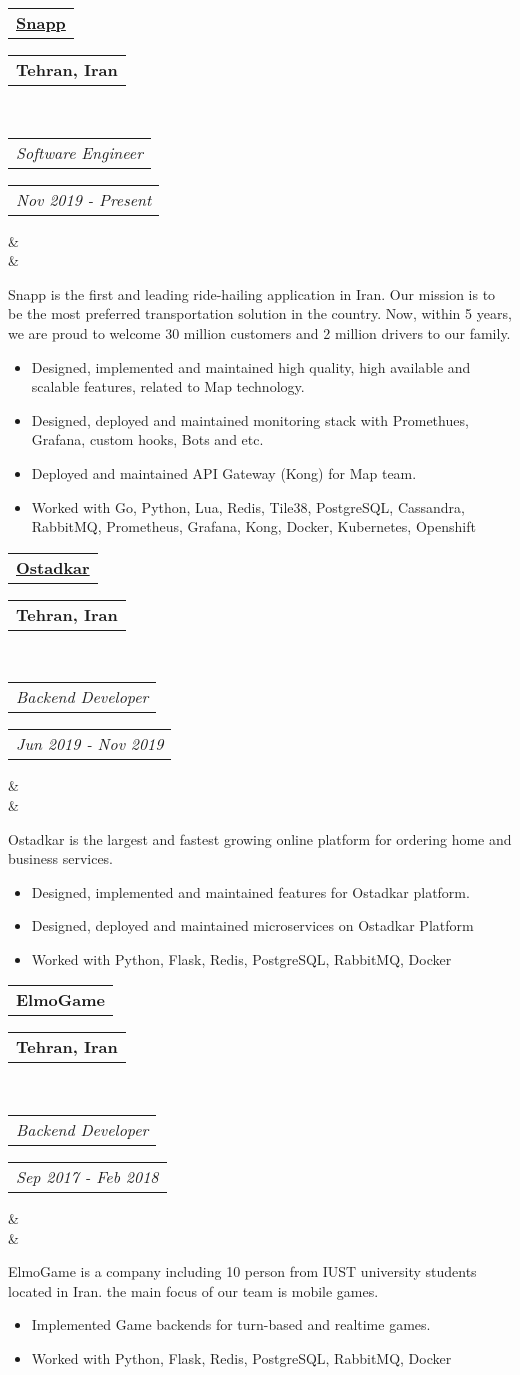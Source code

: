 \documentclass[11pt,a4paper,roman]{moderncv}        %
\makeatletter
\newcommand*{\customcventry}[7][.25em]{
  \begin{tabular}{@{}l}
  {\bfseries #4}
  \end{tabular}
  \hfill%
  \begin{tabular}{l@{}}
  {\bfseries #5}
  \end{tabular} \\
  \begin{tabular}{@{}l}
  {\itshape #3}
  \end{tabular}
  \hfill%
  \begin{tabular}{l@{}}
  {\itshape #2}
  \end{tabular}
  \ifx&#7&%
  \else{\\%
    \begin{minipage}{\maincolumnwidth}%
      \small#7%
    \end{minipage}}\fi%
  \par\addvspace{#1}}
\makeatother
\begin{document}
  {
    \customcventry{Nov 2019 - Present}{Software Engineer}{\href{https://snapp.ir}{Snapp}}{Tehran, Iran}{}
    \\Snapp is the first and leading ride-hailing application in Iran.
    Our mission is to be the most preferred transportation solution in the country.
    Now, within 5 years, we are proud to welcome 30 million customers and 2 million drivers to our family. \\
    {
      \begin{itemize}
        \item Designed, implemented and maintained high quality, high available and scalable features, related to Map technology.
        \item Designed, deployed and maintained monitoring stack with Promethues, Grafana, custom hooks, Bots and etc.
        \item Deployed and maintained API Gateway (Kong) for Map team.
        \item Worked with Go, Python, Lua, Redis, Tile38, PostgreSQL, Cassandra, RabbitMQ, Prometheus, Grafana, Kong, Docker, Kubernetes, Openshift\\
      \end{itemize}
    }

    \customcventry{Jun 2019 - Nov 2019}{Backend Developer}{\href{https://ostadkar.pro}{Ostadkar}}{Tehran, Iran}{}
    \\Ostadkar is the largest and fastest growing online platform for ordering home and business services.\\
    {
      \begin{itemize}
        \item Designed, implemented and maintained features for Ostadkar platform.
        \item Designed, deployed and maintained microservices on Ostadkar Platform
        \item Worked with Python, Flask, Redis, PostgreSQL, RabbitMQ, Docker\\
      \end{itemize}
    }

    \customcventry{Sep 2017 - Feb 2018}{Backend Developer}{ElmoGame}{Tehran, Iran}{}
    \\ElmoGame is a company including 10 person from IUST university students located in Iran.
    the main focus of our team is mobile games.\\
    {
      \begin{itemize}
        \item Implemented Game backends for turn-based and realtime games.
        \item Worked with Python, Flask, Redis, PostgreSQL, RabbitMQ, Docker\\
      \end{itemize}
    }
  }
\end{document}
